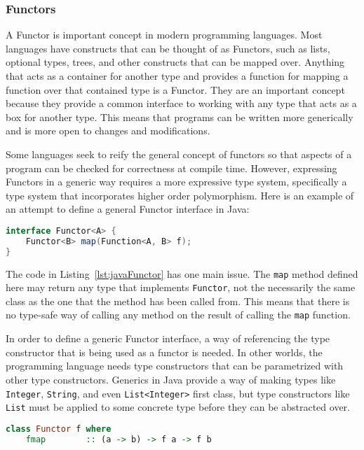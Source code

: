 \subsubsection{Functors}
A Functor is important concept in modern programming languages. Most languages
have constructs that can be thought of as Functors, such as lists, optional types,
trees, and other constructs that can be mapped over. Anything that acts as a
container for another type and provides a function for mapping a function over
that contained type is a Functor. They are an important concept because they
provide a common interface to working with any type that acts as a box for
another type. This means that programs can be written more generically and is
more open to changes and modifications.

Some languages seek to reify the general concept of functors so that aspects of
a program can be checked for correctness at compile time. However, expressing
Functors in a generic way requires a more expressive type system, specifically
a type system that incorporates higher order polymorphism. Here is an example
of an attempt to define a general Functor interface in Java:

\begin{lstlisting}[caption=An attempt to define Functor in Java, language=Java, label={lst:javaFunctor}]
interface Functor<A> {
    Functor<B> map(Function<A, B> f);
}
\end{lstlisting}

The code in Listing~\ref{lst:javaFunctor} has one main issue. The
\lstinline{map} method defined here may return any type that implements
\lstinline{Functor}, not the necessarily the same class as the one that the
method has been called from. This means that there is no type-safe way of
calling any method on the result of calling the \lstinline{map} function.

In order to define a generic Functor interface, a way of referencing the type
constructor that is being used as a functor is needed. In other worlds, the
programming language needs type constructors that can be parametrized with
other type constructors. Generics in Java provide a way of making types like
\lstinline{Integer}, \lstinline{String}, and even \lstinline{List<Integer>}
first class, but type constructors like \lstinline{List} must be applied to
some concrete type before they can be abstracted over.

\begin{lstlisting}[caption=Functor as defined in Haskell., language=Haskell, label={lst:haskellFunctor}]
class Functor f where
    fmap        :: (a -> b) -> f a -> f b
\end{lstlisting}


